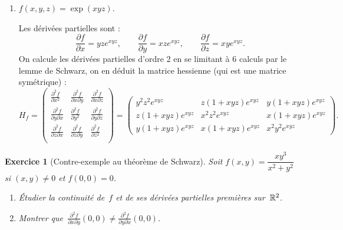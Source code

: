 \documentclass[11pt,a4paper]{article}
\theoremstyle{exostyle}
\newtheorem{exo}{Exercice}
\newcommand{\exercice}[1]{} \newcommand{\finexercice}{}
\newcommand{\enonce}{\begin{exo}} \newcommand{\finenonce}{\end{exo}}
\newcommand{\noindication}{\stepcounter{ind}}
\begin{document}
\begin{enumerate}
	
	\item $f(x,y,z) = \exp(xyz)$.
	

Les dérivées partielles sont :
\[
\frac{\partial f}{\partial x} = yz e^{xyz},
\qquad
\frac{\partial f}{\partial y} = xz e^{xyz},
\qquad
\frac{\partial f}{\partial z} = xy e^{xyz}.
\]
On calcule les dérivées partielles d'ordre 2 en se limitant à $6$ calculs par le lemme de Schwarz, on en déduit la matrice hessienne (qui est une matrice symétrique) :
\[
H_f=
\begin{pmatrix}
	\frac{\partial^2f}{\partial x^2}&\frac{\partial^2f}{\partial x\partial y}&\frac{\partial^2f}{\partial x\partial z}\\  \frac{\partial^2f}{\partial y\partial x}&\frac{\partial^2f}{\partial y^2}&\frac{\partial^2f}{\partial y\partial z}\\  \frac{\partial^2f}{\partial z\partial x}&\frac{\partial^2f}{\partial z\partial y}&\frac{\partial^2f}{\partial z^2}\\
\end{pmatrix}
=
\begin{pmatrix}
	y^2z^2 e^{xyz} & z(1 + xyz) e^{xyz} & y(1 + xyz) e^{xyz} \\
	z(1 + xyz) e^{xyz} & x^2z^2 e^{xyz} & x(1 + xyz) e^{xyz} \\
	y(1 + xyz) e^{xyz} & x(1 + xyz) e^{xyz} & x^2y^2 e^{xyz}
\end{pmatrix}.
\]

\end{enumerate}


\fincorrection
\finexercice


\exercice{4147, quercia, 2010/03/11}
\enonce[Contre-exemple au théorème de Schwarz]

Soit $f(x,y) = \dfrac{xy^3}{x^2+y^2}$ si $(x,y)\ne 0$ et $f(0,0)=0$.
\begin{enumerate}
	\item \'Etudier la continuité de~$f$ et de ses dérivées partielles premières sur~$\mathbb{R}^2$.
	
	\item Montrer que~$\frac{\partial^2 f}{\partial x \partial y}(0,0)\ne\frac{\partial^2 f}{\partial y \partial x}(0,0)$.
\end{enumerate}
\finenonce

\noindication
\end{document}
